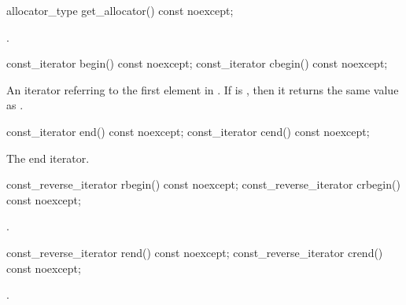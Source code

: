 %
\begin{itemdecl}
allocator_type get_allocator() const noexcept;
\end{itemdecl}

\begin{itemdescr}
\pnum
\returns
{}.
\end{itemdescr}

%
%
\begin{itemdecl}
const_iterator begin() const noexcept;
const_iterator cbegin() const noexcept;
\end{itemdecl}

\begin{itemdescr}
\pnum
\returns
An iterator referring to the first element in .
If  is ,
then it returns the same value as .
\end{itemdescr}

%
%
\begin{itemdecl}
const_iterator end() const noexcept;
const_iterator cend() const noexcept;
\end{itemdecl}

\begin{itemdescr}
\pnum
\returns
The end iterator.
\end{itemdescr}

%
%
\begin{itemdecl}
const_reverse_iterator rbegin() const noexcept;
const_reverse_iterator crbegin() const noexcept;
\end{itemdecl}

\begin{itemdescr}
\pnum
\returns
{}.
\end{itemdescr}

%
%
\begin{itemdecl}
const_reverse_iterator rend() const noexcept;
const_reverse_iterator crend() const noexcept;
\end{itemdecl}

\begin{itemdescr}
\pnum
\returns
{}.
\end{itemdescr}

